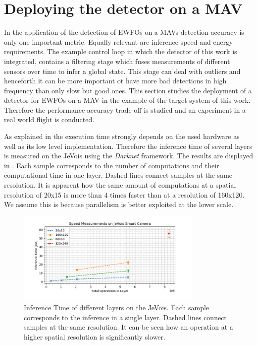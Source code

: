 \section{Deploying the detector on a \ac{MAV}}

In the application of the detection of \acp{EWFO} on a \acp{MAV} detection accuracy is only one important metric. Equally relevant are inference speed and energy requirements. The example control loop in which the detector of this work is integrated, contains a filtering stage which fuses measurements of different sensors over time to infer a global state. This stage can deal with outliers and henceforth it can be more important ot have more bad detections in high frequency than only slow but good ones. This section studies the deployment of a detector for \acp{EWFO} on a \ac{MAV} in the example of the target system of this work. Therefore the performance-accuracy trade-off is studied and an experiment in a real world flight is conducted.

As explained in  the execution time strongly depends on the used hardware as well as its low level implementation. Therefore the inference time of several layers is measured on the JeVois using the \textit{Darknet} framework. The results are displayed in . Each sample corresponds to the number of computations and their computational time in one layer. Dashed lines connect samples at the same resolution. It is apparent how the same amount of computations at a spatial resolution of 20x15 is more than 4 times faster than at a resolution of 160x120. We assume this is because parallelism is better exploited at the lower scale.

\begin{figure}[hbtp]
	\centering
	\includegraphics[width=0.8\textwidth]{fig/bottleneck_jevois}
	\caption{Inference Time of different layers on the JeVois. Each sample corresponds to the inference in a single layer. Dashed lines connect samples at the same resolution. It can be seen how an operation at a higher spatial resolution is significantly slower.}
	\label{fig:bottleneck_jevois}
\end{figure}


